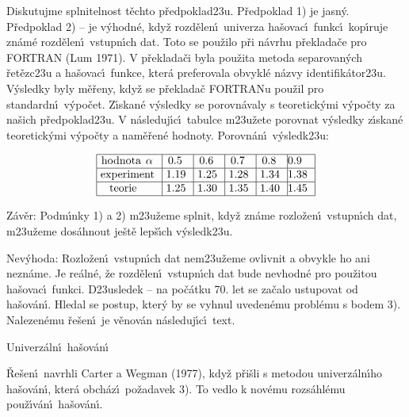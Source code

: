 \documentclass[a4paper,12pt]{article}
\begin{document}
\flushpar Diskutujme splnitelnost t\v echto p\v redpoklad\accent23u.\newline 
P\v redpoklad 1) je jasn\'y.\newline 
P\v redpoklad 2) -- je v\'yhodn\'e, 
kdy\v z rozd\v elen\'\i\ univerza ha\v sovac\'\i\ funkc\'\i\ kop\'\i ruje zn\'am\'e 
rozd\v ele\-n\'\i\ vstupn\'\i ch dat. Toto se pou\v zilo p\v ri n\'avrhu 
p\v reklada\v ce pro FORTRAN (Lum 1971). V p\v reklada\v ci byla pou\v zita metoda separovan\'ych \v ret\v ezc\accent23u a ha\v sovac\'\i\ funkce, 
kter\'a preferovala obvykl\'e n\'azvy identifik\'ator\accent23u. V\'ysledky byly m\v e\v reny, kdy\v z se p\v reklada\v c FORTRANu pou\v zil pro standardn\'\i\ v\'ypo\v cet. Z\'\i skan\'e v\'ysledky se porovn\'avaly s teoretick\'ymi v\'ypo\v cty za na\v sich p\v redpoklad\accent23u. V 
n\'asleduj\'\i c\'\i\ tabulce m\accent23u\v zete porovnat v\'ysledky 
z\'\i skan\'e teoretick\'ymi v\'ypo\v cty a nam\v e\v ren\'e hodnoty.
Porovn\'an\'\i\ v\'ysledk\accent23u:
\smallskip

$$\vtop{\offinterlineskip\halign {\strut\vrule\ # & \vrule\ # & \vrule\ # & \vrule\ # & \vrule\ # & \vrule \hfil # \hfil \vrule\cr\noalign{\hrule}hodnota $\alpha$ & 0.5 & 0.6 & 0.7 & 0.8 & 0.9 \hfill \cr\noalign{\hrule}experiment & 1.19 & 1.25 & 1.28 & 1.34 & 1.38 \cr\noalign{\hrule}teorie & 1.25 & 1.30 & 1.35 & 1.40 & 1.45 \cr\noalign{\hrule}}}$$
\medskip

\flushpar Z\'av\v er: Podm\'\i nky 1) a 2) m\accent23u\v zeme splnit, 
kdy\v z zn\'ame rozlo\v zen\'\i\ vstupn\'\i ch dat, m\accent23u\v zeme 
dos\'ahnout je\v st\v e lep\v s\'\i ch v\'ysledk\accent23u.
\medskip

\flushpar Nev\'yhoda: Rozlo\v zen\'\i\ vstupn\'\i ch dat 
nem\accent23u\v zeme ovlivnit a obvykle ho ani nezn\'ame. Je 
re\'aln\'e, \v ze rozd\v elen\'\i\ vstupn\'\i ch dat bude nevhodn\'e pro 
pou\v zitou ha\v sovac\'\i\ funkci. D\accent23usledek -- na po\v c\'atku 
70. let se za\v calo ustupovat od ha\v sov\'an\'\i . Hledal se postup, 
kter\'y by se vyhnul uveden\'emu probl\'emu s bodem 3). Nalezen\'emu 
\v re\v sen\'\i\ je v\v enov\'an n\'asleduj\'\i c\'\i\ text.
\medskip


\heading
Univerz\'aln\'\i\ ha\v sov\'an\'\i
\endheading

\flushpar\v Re\v sen\'\i\ navrhli Carter a Wegman (1977), kdy\v z p\v ri\v sli s 
metodou univerz\'aln\'\i ho ha\v sov\'an\'\i , kter\'a obch\'az\'\i\ po\v za\-davek 3).  
To vedlo k nov\'emu rozs\'ahl\'emu pou\v z\'\i v\'an\'\i\ ha\v sov\'an\'\i .  
\medskip
\end{document}

